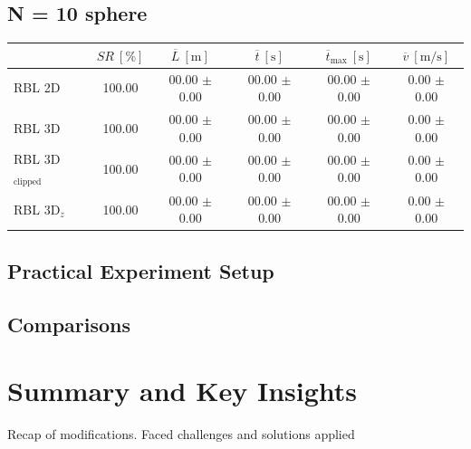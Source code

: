         \subsection{N = 10 sphere}
            \begin{table}[H]
                \centering
                \renewcommand{\arraystretch}{1.2}
                \begin{tabular}{|l|c|c|c|c|c|}
                \hline
                                            & \( SR \ [\%] \) & \( \overline{L} \ [\mathrm{m}] \) & \( \overline{t} \ [\mathrm{s}] \) & \( \overline{t}_{\text{max}} \ [\mathrm{s}] \) & \( \overline{v} \ [\mathrm{m/s}] \)     \\ \hline
                RBL 2D                      & 100.00          & 00.00 $\pm$ 0.00                  & 00.00 $\pm$ 0.00                  & 00.00 $\pm$ 0.00                               & 0.00 $\pm$ 0.00                         \\ \hline
                RBL 3D                      & 100.00          & 00.00 $\pm$ 0.00                  & 00.00 $\pm$ 0.00                  & 00.00 $\pm$ 0.00                               & 0.00 $\pm$ 0.00                         \\ \hline
                RBL 3D\(_{\text{clipped}}\) & 100.00          & 00.00 $\pm$ 0.00                  & 00.00 $\pm$ 0.00                  & 00.00 $\pm$ 0.00                               & 0.00 $\pm$ 0.00                         \\ \hline
                RBL 3D\(_z\)                & 100.00          & 00.00 $\pm$ 0.00                  & 00.00 $\pm$ 0.00                  & 00.00 $\pm$ 0.00                               & 0.00 $\pm$ 0.00                         \\ \hline
                \end{tabular}
            \end{table}


    \subsection{Practical Experiment Setup}
            
    \subsection{Comparisons}

\section{Summary and Key Insights}

    Recap of modifications. Faced challenges and solutions applied
